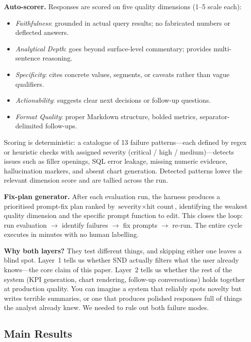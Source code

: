 \documentclass[conference]{IEEEtran}
\begin{document}
\textbf{Auto-scorer.} Responses are scored on five quality
dimensions (1--5 scale each):

\begin{itemize}
  \item \textit{Faithfulness}: grounded in actual query results;
  no fabricated numbers or deflected answers.
  \item \textit{Analytical Depth}: goes beyond surface-level
  commentary; provides multi-sentence reasoning.
  \item \textit{Specificity}: cites concrete values, segments,
  or caveats rather than vague qualifiers.
  \item \textit{Actionability}: suggests clear next decisions
  or follow-up questions.
  \item \textit{Format Quality}: proper Markdown structure,
  bolded metrics, separator-delimited follow-ups.
\end{itemize}

Scoring is deterministic: a catalogue of 13 failure patterns---each
defined by regex or heuristic checks with assigned severity
(critical / high / medium)---detects issues such as filler openings,
SQL error leakage, missing numeric evidence, hallucination markers,
and absent chart generation. Detected patterns lower the relevant
dimension score and are tallied across the run.

\textbf{Fix-plan generator.} After each evaluation run, the harness
produces a prioritised prompt-fix plan ranked by
$\text{severity} \times \text{hit count}$, identifying the weakest
quality dimension and the specific prompt function to edit. This
closes the loop: run evaluation $\to$ identify failures $\to$ fix
prompts $\to$ re-run. The entire cycle executes in minutes with no
human labelling.

\textbf{Why both layers?} They test different things, and skipping
either one leaves a blind spot. Layer~1 tells us whether SND
actually filters what the user already knows---the core claim of
this paper. Layer~2 tells us whether the rest of the system
(KPI generation, chart rendering, follow-up conversations) holds
together at production quality. You can imagine a system that
reliably spots novelty but writes terrible summaries, or one that
produces polished responses full of things the analyst already knew.
We needed to rule out both failure modes.

\subsection{Main Results}
\end{document}

